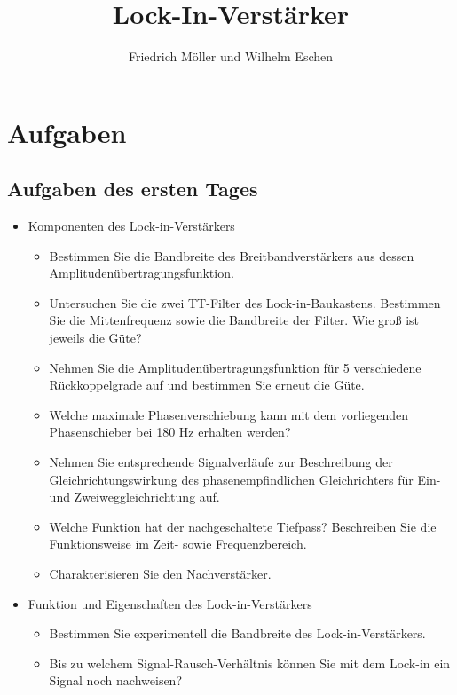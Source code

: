\documentclass{scrartcl}						%
\title{Lock-In-Verstärker}
\author{Friedrich Möller und Wilhelm Eschen}
\begin{document}
	\maketitle
	\tableofcontents
	\clearpage
			

\section{Aufgaben}

\subsection{Aufgaben des ersten Tages}
	\begin{itemize}
		\item Komponenten des Lock-in-Verstärkers
		\begin{itemize}
			\item Bestimmen Sie die Bandbreite des Breitbandverstärkers aus dessen Amplitudenübertragungsfunktion.
			\item Untersuchen Sie die zwei TT-Filter des Lock-in-Baukastens. Bestimmen Sie die Mittenfrequenz sowie die Bandbreite der Filter. Wie groß ist jeweils die Güte?
			\item Nehmen Sie die Amplitudenübertragungsfunktion für 5 verschiedene Rückkoppelgrade auf und bestimmen Sie erneut die Güte.
			\item Welche maximale Phasenverschiebung kann mit dem vorliegenden Phasenschieber bei 180 Hz erhalten werden?
			\item Nehmen Sie entsprechende Signalverläufe zur Beschreibung der Gleichrichtungswirkung des phasenempfindlichen Gleichrichters für Ein- und Zweiweggleichrichtung auf.
			\item Welche Funktion hat der nachgeschaltete Tiefpass? Beschreiben Sie die Funktionsweise im Zeit- sowie Frequenzbereich.
			\item Charakterisieren Sie den Nachverstärker.
		\end{itemize}
		\item Funktion und Eigenschaften des Lock-in-Verstärkers
		\begin{itemize}
			\item Bestimmen Sie experimentell die Bandbreite des Lock-in-Verstärkers.
			\item Bis zu welchem Signal-Rausch-Verhältnis können Sie mit dem Lock-in ein Signal noch nachweisen?
		\end{itemize}
	\end{itemize}
	
\end{document}
